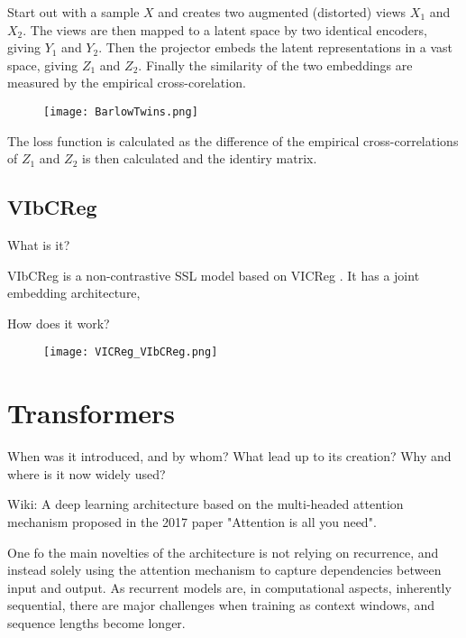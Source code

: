 \documentclass[../../thesis.tex]{subfiles}
\begin{document}
Start out with a sample $X$ and creates two augmented (distorted) views $X_1$ and $X_2$. The views are then mapped to a latent space by two identical encoders, giving $Y_1$ and $Y_2$. Then the projector embeds the latent representations in a vast space, giving $Z_1$ and $Z_2$. Finally the similarity of the two embeddings are measured by the empirical cross-corelation.

\begin{figure}[h]
    \texttt{[image: BarlowTwins.png]}
    \centering    
    \caption{\cite{zbontar2021barlow}}
\end{figure}

The loss function is calculated as the difference of the empirical cross-correlations of $Z_1$ and $Z_2$ is then calculated and the identiry matrix. 


\subsection{VIbCReg}
What is it?

VIbCReg \cite{lee2024vibcreg} is a non-contrastive SSL model based on VICReg \cite{bardes2022vicreg}. It has a joint embedding architecture,

How does it work?


\begin{figure}[h]
    \texttt{[image: VICReg\_VIbCReg.png]}
    \centering    
    \caption{\cite{lee2024vibcreg}}
\end{figure}



\section{Transformers}

When was it introduced, and by whom?
What lead up to its creation?
Why and where is it now widely used? 


Wiki: A deep learning architecture based on the multi-headed attention mechanism proposed in the 2017 paper "Attention is all you need".

One fo the main novelties of the architecture is not relying on recurrence, and instead solely using the attention mechanism to capture dependencies between input and output. As recurrent models are, in computational aspects, inherently sequential, there are major challenges when training as context windows, and sequence lengths become longer. 
\end{document}
